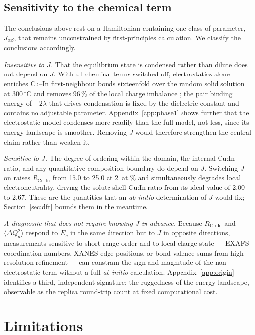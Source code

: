 \documentclass[11pt,a4paper]{article}
\newcommand{\dQ}{\Delta Q}
\newcommand{\RCuIn}{R_{\mathrm{Cu\text{-}In}}}
\begin{document}
\subsection{Sensitivity to the chemical term}
\label{sec:jsensitivity}

The conclusions above rest on a Hamiltonian containing one class of parameter,
$J_{\alpha\beta}$, that remains unconstrained by first-principles calculation.
We classify the conclusions accordingly.

\emph{Insensitive to $J$.} That the equilibrium state is condensed rather than
dilute does not depend on $J$. With all chemical terms switched off,
electrostatics alone enriches Cu--In first-neighbour bonds sixteenfold over the
random solid solution at $300\,^\circ$C and removes 96\,\% of the local charge
imbalance \citep{yu2026}; the pair binding energy of $-2\lambda$ that drives
condensation is fixed by the dielectric constant and contains no adjustable
parameter. Appendix~\ref{app:phase1} shows further that the electrostatic model
condenses more readily than the full model, not less, since its energy landscape
is smoother. Removing $J$ would therefore strengthen the central claim rather
than weaken it.

\emph{Sensitive to $J$.} The degree of ordering within the domain, the internal
Cu:In ratio, and any quantitative composition boundary do depend on $J$.
Switching $J$ on raises $\RCuIn$ from 16.0 to 25.0 at 2~at.\% and simultaneously
degrades local electroneutrality, driving the solute-shell Cu:In ratio from its
ideal value of 2.00 to 2.67. These are the quantities that an \textit{ab initio} determination of $J$ would
fix; Section~\ref{sec:dft} bounds them in the meantime.

\emph{A diagnostic that does not require knowing $J$ in advance.} Because
$\RCuIn$ and $\langle\dQ_a^2\rangle$ respond to $E_c$ in the same direction but
to $J$ in opposite directions, measurements sensitive to short-range order and
to local charge state --- EXAFS coordination numbers, XANES edge positions, or
bond-valence sums from high-resolution refinement --- can constrain the sign and
magnitude of the non-electrostatic term without a full \textit{ab initio}
calculation. Appendix~\ref{app:origin} identifies a third, independent
signature: the ruggedness of the energy landscape, observable as the replica
round-trip count at fixed computational cost.

\section{Limitations}
\label{sec:limitations}
\end{document}
